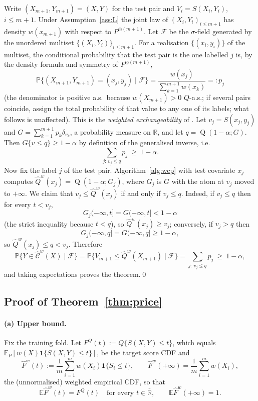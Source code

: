 \documentclass[11pt,a4paper]{article}
\newcommand{\E}{\mathbb{E}}
\newcommand{\Prob}{\mathbb{P}}
\newcommand{\R}{\mathbb{R}}
\newcommand{\Rbar}{\overline{\mathbb{R}}}
\newcommand{\Cset}{\widehat{\mathcal C}}
\newcommand{\ind}{\mathbf 1}
\DeclareMathOperator{\Qf}{Q}
\theoremstyle{plain}
\theoremstyle{definition}
\theoremstyle{remark}
\begin{document}
Write $(X_{m+1},Y_{m+1})=(X,Y)$ for the test pair and $V_i=S(X_i,Y_i)$, $i\le m+1$. Under Assumption~\ref{ass:L} the joint law of $(X_i,Y_i)_{i\le m+1}$ has density $w(x_{m+1})$ with respect to $P^{\otimes(m+1)}$. Let $\mathcal F$ be the $\sigma$-field generated by the unordered multiset $\{(X_i,Y_i)\}_{i\le m+1}$. For a realisation $\{(x_i,y_i)\}$ of the multiset, the conditional probability that the test pair is the one labelled $j$ is, by the density formula and symmetry of $P^{\otimes(m+1)}$,
\[
\Prob\{(X_{m+1},Y_{m+1})=(x_j,y_j)\mid\mathcal F\}=\frac{w(x_j)}{\sum_{k=1}^{m+1}w(x_k)}=:p_j
\]
(the denominator is positive a.s.\ because $w(X_{m+1})>0$ $Q$-a.s.; if several pairs coincide, assign the total probability of that value to any one of its labels; what follows is unaffected). This is the \emph{weighted exchangeability} of \cite{tibshirani2019}. Let $v_j=S(x_j,y_j)$ and $G=\sum_{k=1}^{m+1}p_k\delta_{v_k}$, a probability measure on $\R$, and let $q=\Qf(1-\alpha;G)$. Then $G\{v\le q\}\ge1-\alpha$ by definition of the generalised inverse, i.e.
\[
\sum_{j:\,v_j\le q}p_j\ \ge\ 1-\alpha .
\]
Now fix the label $j$ of the test pair. Algorithm~\ref{alg:wcp} with test covariate $x_j$ computes $\widehat Q^w(x_j)=\Qf(1-\alpha;G_j)$, where $G_j$ is $G$ with the atom at $v_j$ moved to $+\infty$. We claim that $v_j\le\widehat Q^w(x_j)$ if and only if $v_j\le q$. Indeed, if $v_j\le q$ then for every $t<v_j$,
\[
G_j(-\infty,t]=G(-\infty,t]<1-\alpha
\]
(the strict inequality because $t<q$), so $\widehat Q^w(x_j)\ge v_j$; conversely, if $v_j>q$ then
\[
G_j(-\infty,q]=G(-\infty,q]\ge1-\alpha,
\]
so $\widehat Q^w(x_j)\le q<v_j$. Therefore
\[
\Prob\{Y\in\Cset^w(X)\mid\mathcal F\}=\Prob\{V_{m+1}\le\widehat Q^w(X_{m+1})\mid\mathcal F\}=\sum_{j:\,v_j\le q}p_j\ \ge\ 1-\alpha,
\]
and taking expectations proves the theorem.\qed

\subsection{Proof of Theorem~\ref{thm:price}}\label{app:price}

\paragraph{(a) Upper bound.}
Fix the training fold. Let $F^Q(t):=Q\{S(X,Y)\le t\}$, which equals $\E_P[w(X)\ind\{S(X,Y)\le t\}]$, be the target score CDF and
\[
\widehat F^w(t):=\frac1m\sum_{i=1}^m w(X_i)\ind\{S_i\le t\},\qquad \widehat F^w(+\infty)=\frac1m\sum_{i=1}^m w(X_i),
\]
the (unnormalised) weighted empirical CDF, so that
\[
\E\widehat F^w(t)=F^Q(t)\quad\text{for every }t\in\Rbar,\qquad \E\widehat F^w(+\infty)=1 .
\]
\end{document}
